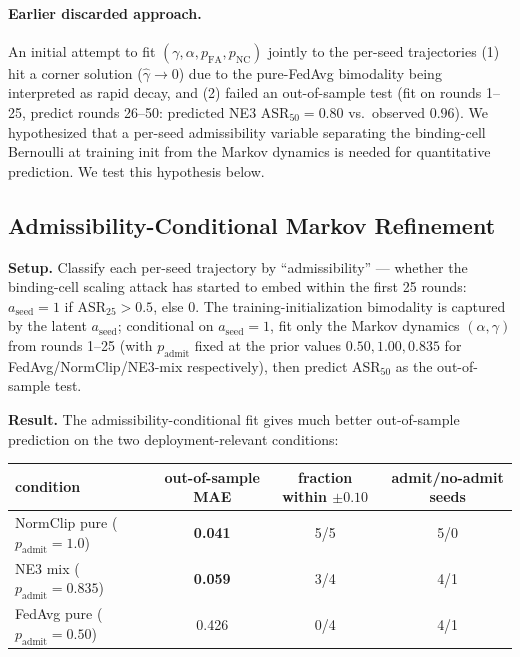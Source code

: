 \documentclass{article}
\begin{document}
\paragraph{Earlier discarded approach.} An initial attempt to fit $(\gamma, \alpha, p_{\mathrm{FA}}, p_{\mathrm{NC}})$ jointly to the per-seed trajectories (1) hit a corner solution ($\hat\gamma \to 0$) due to the pure-FedAvg bimodality being interpreted as rapid decay, and (2) failed an out-of-sample test (fit on rounds 1--25, predict rounds 26--50: predicted NE3 ASR$_{50} = 0.80$ vs.\ observed $0.96$). We hypothesized that a per-seed admissibility variable separating the binding-cell Bernoulli at training init from the Markov dynamics is needed for quantitative prediction. We test this hypothesis below.

\subsection{Admissibility-Conditional Markov Refinement}
\label{app:persistence_admissibility_v3}

\textbf{Setup.} Classify each per-seed trajectory by ``admissibility'' --- whether the binding-cell scaling attack has started to embed within the first 25 rounds: $a_{\mathrm{seed}} = 1$ if ASR$_{25} > 0.5$, else $0$. The training-initialization bimodality is captured by the latent $a_{\mathrm{seed}}$; conditional on $a_{\mathrm{seed}}=1$, fit only the Markov dynamics $(\alpha, \gamma)$ from rounds 1--25 (with $p_{\mathrm{admit}}$ fixed at the prior values $0.50, 1.00, 0.835$ for FedAvg/NormClip/NE3-mix respectively), then predict ASR$_{50}$ as the out-of-sample test.

\textbf{Result.} The admissibility-conditional fit gives much better out-of-sample prediction on the two deployment-relevant conditions:
\begin{center}\small
\begin{tabular}{l|cc|c}
\toprule
condition & out-of-sample MAE & fraction within $\pm 0.10$ & admit/no-admit seeds \\
\midrule
NormClip pure ($p_{\mathrm{admit}}=1.0$)  & \textbf{0.041} & 5/5 & 5/0 \\
NE3 mix ($p_{\mathrm{admit}}=0.835$)       & \textbf{0.059} & 3/4 & 4/1 \\
FedAvg pure ($p_{\mathrm{admit}}=0.50$)    & 0.426 & 0/4 & 4/1 \\
\bottomrule
\end{tabular}
\end{center}
\end{document}
